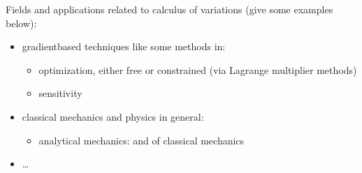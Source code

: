 \documentclass[letterpaper,10pt,english]{jupyterBook}
\begin{document}
\sphinxAtStartPar
Fields and applications related to calculus of variations (give some examples below):
\begin{itemize}
\item {} 
\sphinxAtStartPar
gradient\sphinxhyphen{}based techniques like some methods in:
\begin{itemize}
\item {} 
\sphinxAtStartPar
optimization, either free or constrained (via Lagrange multiplier methods)

\item {} 
\sphinxAtStartPar
sensitivity

\end{itemize}

\item {} 
\sphinxAtStartPar
classical mechanics and physics in general:
\begin{itemize}
\item {} 
\sphinxAtStartPar
analytical mechanics:  and  of classical mechanics

\end{itemize}

\item {} 
\sphinxAtStartPar
…

\end{itemize}
\end{document}
